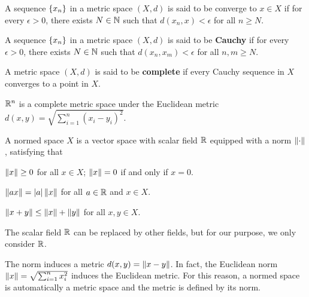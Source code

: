 \documentclass[12pt]{article}
\begin{document}
\begin{definition}
    A sequence $\left\{ {x_n} \right\}$ in a metric space $(X, d)$ is said to be 
    converge to $x \in X$ if for every $\epsilon > 0$, there exists 
    $N \in \mathbb{N}$ such that $d(x_n, x) < \epsilon$ for all $n \geq N$.
\end{definition}

\begin{definition}
    A sequence $\left\{ {x_n} \right\}$ in a metric space $(X, d)$ is said to be 
    \textbf{Cauchy} if for every $\epsilon > 0$, there exists $N \in 
    \mathbb{N}$ such that $d(x_n, x_m) < \epsilon$ for all $n, m \geq N$.
\end{definition}

\begin{definition}
    A metric space $(X, d)$ is said to be \textbf{complete} if every 
    Cauchy sequence in $X$ converges to a point in $X$.
\end{definition}

\begin{remark}
    $\mathbb{R}^n$ is a complete metric space under the Euclidean metric $d(x,y) = 
    \sqrt{\sum_{i=1}^{n}(x_i-y_i)^2}$.
\end{remark}

\begin{definition}
    A normed space $X$ is a vector space with scalar field $\mathbb{R}$
    equipped with a norm $\left\lVert {\cdot} \right\rVert$, satisfying that 
    \begin{thmenum}
        \item $\left\lVert {x} \right\rVert \geq 0$ for all $x\in X$; $\left\lVert {x} \right\rVert = 0$ if 
        and only if $x = 0$.
        \item $\left\lVert {ax} \right\rVert = \left\lvert {a} \right\rvert\left\lVert {x} \right\rVert$ for all $a\in\mathbb{R}$ and $x\in X$.
        \item $\left\lVert {x+y} \right\rVert \leq \left\lVert {x} \right\rVert + \left\lVert {y} \right\rVert$ for all $x, y\in X$.
    \end{thmenum}
\end{definition}

\begin{remark}
    The scalar field $\mathbb{R}$ can be replaced by other fields, but 
    for our purpose, we only consider $\mathbb{R}$.
\end{remark}

\begin{remark}
    The norm induces a metric $d(x, y) = \left\lVert {x-y} \right\rVert$. In fact, 
    the Euclidean norm $\left\lVert {x} \right\rVert = \sqrt{\sum_{i=1}^{n}x_i^2}$ 
    induces the Euclidean metric. For this reason, a normed 
    space is automatically a metric space and the metric is 
    defined by its norm.
\end{remark}
\end{document}
